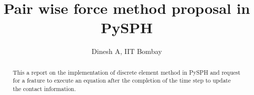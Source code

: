 \documentclass{article}
\begin{document}
\title{\sffamily \textbf{Pair wise force method proposal in PySPH}}

\author{Dinesh A, IIT Bombay}

\maketitle


\begin{abstract}
  This a report on the implementation of discrete element method in PySPH and
  request for a feature to execute an equation after the completion of the time
  step to update the contact information.
\end{abstract}




% 
% 
\end{document}
